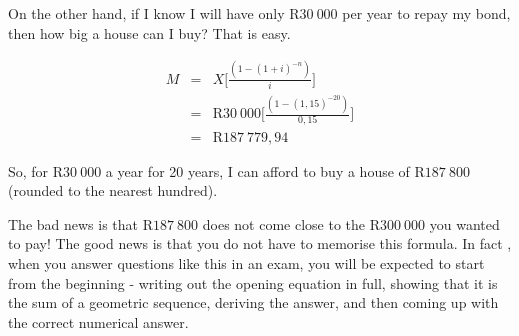 On the other hand, if I know I will have only R$30~000$ per year to repay my bond, then how big a house can I buy? That is easy.

\begin{eqnarray*}
M &=& X \biggl[\frac{(1-(1+i)^{-n})}{i}\biggr]\\
&=& \mbox{R}30~000 \biggl[\frac{(1-(1,15)^{-20})}{0,15}\biggr]\\
&=& \mbox{R}187~779,94
\end{eqnarray*}

So, for R$30~000$ a year for 20 years, I can afford to buy a house of R$187~800$ (rounded to the nearest hundred).

The bad news is that R$187~800$ does not come close to the R$300~000$ you wanted to pay! The good news is that you do not have to memorise this formula. In fact , when you answer questions like this in an exam, you will be expected to start from the beginning - writing out the opening equation in full, showing that it is the sum of a geometric sequence, deriving the answer, and then coming up with the correct numerical answer.

